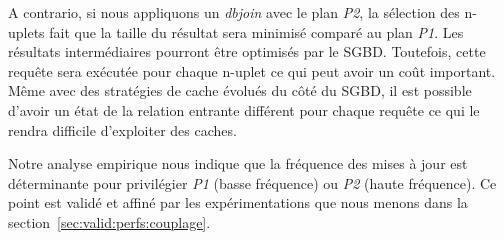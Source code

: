 A contrario, si nous appliquons un \textit{dbjoin} avec le plan \textit{P2}, la sélection des n-uplets fait que la taille du résultat sera minimisé comparé au plan \textit{P1}. Les résultats intermédiaires pourront être optimisés par le SGBD. Toutefois, cette requête sera exécutée pour chaque n-uplet ce qui peut avoir un coût important. Même avec des stratégies de cache évolués du côté du SGBD, il est possible d'avoir un état de la relation entrante différent pour chaque requête ce qui le rendra difficile d'exploiter des caches.

Notre analyse empirique nous indique que la fréquence des mises à jour est déterminante pour privilégier \textit{P1} (basse fréquence) ou \textit{P2} (haute fréquence). Ce point est validé et affiné par les expérimentations que nous menons dans la section~\ref{sec:valid:perfs:couplage}.
